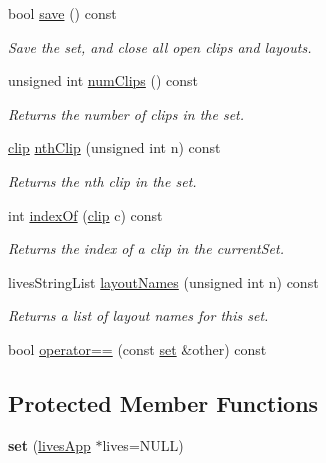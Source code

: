 \begin{DoxyCompactItemize}
bool \hyperlink{classlives_1_1set_a1c57075100dfc663bb86a6a94ee126b4}{save} () const 
\begin{DoxyCompactList}\small\item\em Save the set, and close all open clips and layouts. \end{DoxyCompactList}\item 
unsigned int \hyperlink{classlives_1_1set_a85bacacdd7d1941cf3ee313ce522139c}{num\-Clips} () const 
\begin{DoxyCompactList}\small\item\em Returns the number of clips in the set. \end{DoxyCompactList}\item 
\hyperlink{classlives_1_1clip}{clip} \hyperlink{classlives_1_1set_a1a24eb00d4f9c35592a74079d19be4fd}{nth\-Clip} (unsigned int n) const 
\begin{DoxyCompactList}\small\item\em Returns the nth clip in the set. \end{DoxyCompactList}\item 
int \hyperlink{classlives_1_1set_a1a0af437eba187401b8803a931e0f5ee}{index\-Of} (\hyperlink{classlives_1_1clip}{clip} c) const 
\begin{DoxyCompactList}\small\item\em Returns the index of a clip in the current\-Set. \end{DoxyCompactList}\item 
lives\-String\-List \hyperlink{classlives_1_1set_ab02301ddfaf7bad0d1ed15cc5ee7f973}{layout\-Names} (unsigned int n) const 
\begin{DoxyCompactList}\small\item\em Returns a list of layout names for this set. \end{DoxyCompactList}\item 
bool \hyperlink{classlives_1_1set_ab949bb483ea1735a0433f4ab5fc8887d}{operator==} (const \hyperlink{classlives_1_1set}{set} \&other) const 
\end{DoxyCompactItemize}
\subsection*{Protected Member Functions}
\begin{DoxyCompactItemize}
\item 
\hypertarget{classlives_1_1set_aa12b1a363b3eee6bbc204438ee9a796e}{{\bfseries set} (\hyperlink{classlives_1_1livesApp}{lives\-App} $\ast$lives=N\-U\-L\-L)}\label{classlives_1_1set_aa12b1a363b3eee6bbc204438ee9a796e}

\end{DoxyCompactItemize}


